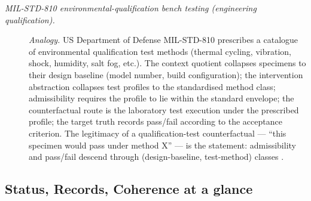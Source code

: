 \begingroup\small
\begin{description}
\item[\emph{{MIL-STD-810} environmental-qualification
bench testing (engineering qualification).}] \textit{Analogy.}
US Department of Defense MIL-STD-810 prescribes a
catalogue of environmental qualification test methods
(thermal cycling, vibration, shock, humidity, salt fog,
etc.).  The context quotient collapses specimens to
their design baseline (model number, build
configuration); the intervention abstraction collapses
test profiles to the standardised method class;
admissibility requires the profile to lie within the
standard envelope; the counterfactual route is the
laboratory test execution under the prescribed
profile; the target truth records pass/fail according
to the acceptance criterion.  The legitimacy of a
qualification-test counterfactual --- ``this specimen
would pass under method X'' --- is the  statement:
admissibility and pass/fail descend through
(design-baseline, test-method) classes
\citep{MILSTD810H2019}.

\end{description}
\endgroup


\subsection*{Status, Records, Coherence at a glance}\label{sec:status-records-coherence:summary}

\FloatBarrier
